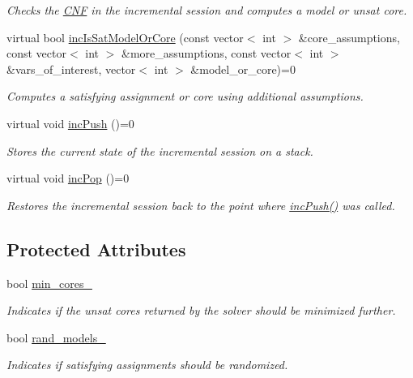 \begin{DoxyCompactItemize}
\begin{DoxyCompactList}\small\item\em Checks the \hyperlink{classCNF}{C\-N\-F} in the incremental session and computes a model or unsat core. \end{DoxyCompactList}\item 
virtual bool \hyperlink{classSatSolver_a29225bfab1f352cae27c68e9bda4d409}{inc\-Is\-Sat\-Model\-Or\-Core} (const vector$<$ int $>$ \&core\-\_\-assumptions, const vector$<$ int $>$ \&more\-\_\-assumptions, const vector$<$ int $>$ \&vars\-\_\-of\-\_\-interest, vector$<$ int $>$ \&model\-\_\-or\-\_\-core)=0
\begin{DoxyCompactList}\small\item\em Computes a satisfying assignment or core using additional assumptions. \end{DoxyCompactList}\item 
virtual void \hyperlink{classSatSolver_a4da0dff7082a91429e3311d279605be4}{inc\-Push} ()=0
\begin{DoxyCompactList}\small\item\em Stores the current state of the incremental session on a stack. \end{DoxyCompactList}\item 
virtual void \hyperlink{classSatSolver_a436aae045eb04141c834df0b55947ee5}{inc\-Pop} ()=0
\begin{DoxyCompactList}\small\item\em Restores the incremental session back to the point where \hyperlink{classSatSolver_a4da0dff7082a91429e3311d279605be4}{inc\-Push()} was called. \end{DoxyCompactList}\end{DoxyCompactItemize}
\subsection*{Protected Attributes}
\begin{DoxyCompactItemize}
\item 
bool \hyperlink{classSatSolver_adfeecebfd09606c82b5c57cfe5aad813}{min\-\_\-cores\-\_\-}
\begin{DoxyCompactList}\small\item\em Indicates if the unsat cores returned by the solver should be minimized further. \end{DoxyCompactList}\item 
bool \hyperlink{classSatSolver_a73fed24d8fb4da85ef82dc53ac5f28c7}{rand\-\_\-models\-\_\-}
\begin{DoxyCompactList}\small\item\em Indicates if satisfying assignments should be randomized. \end{DoxyCompactList}\end{DoxyCompactItemize}
